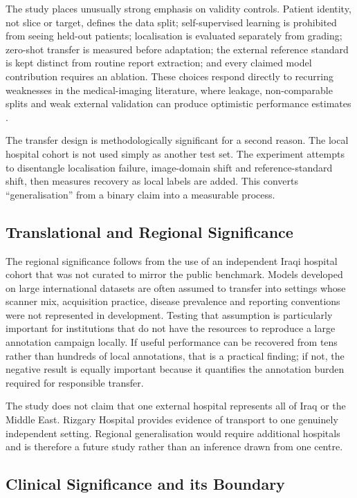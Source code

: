 The study places unusually strong emphasis on validity controls. Patient identity,
not slice or target, defines the data split; self-supervised learning is prohibited
from seeing held-out patients; localisation is evaluated separately from grading;
zero-shot transfer is measured before adaptation; the external reference standard is
kept distinct from routine report extraction; and every claimed model contribution
requires an ablation. These choices respond directly to recurring weaknesses in the
medical-imaging literature, where leakage, non-comparable splits and weak external
validation can produce optimistic performance estimates
\cite{compte2023are,wang2024machine}.

The transfer design is methodologically significant for a second reason. The local
hospital cohort is not used simply as another test set. The experiment attempts to
disentangle localisation failure, image-domain shift and reference-standard shift,
then measures recovery as local labels are added. This converts ``generalisation''
from a binary claim into a measurable process.

\subsection{Translational and Regional Significance}
\label{sec:intro-significance-regional}

The regional significance follows from the use of an independent Iraqi hospital
cohort that was not curated to mirror the public benchmark. Models developed on
large international datasets are often assumed to transfer into settings whose
scanner mix, acquisition practice, disease prevalence and reporting conventions were
not represented in development. Testing that assumption is particularly important
for institutions that do not have the resources to reproduce a large annotation
campaign locally. If useful performance can be recovered from tens rather than
hundreds of local annotations, that is a practical finding; if not, the negative
result is equally important because it quantifies the annotation burden required for
responsible transfer.

The study does not claim that one external hospital represents all of Iraq or the
Middle East. Rizgary Hospital provides evidence of transport to one genuinely
independent setting. Regional generalisation would require additional hospitals and
is therefore a future study rather than an inference drawn from one centre.

\subsection{Clinical Significance and its Boundary}
\label{sec:intro-significance-clinical}

